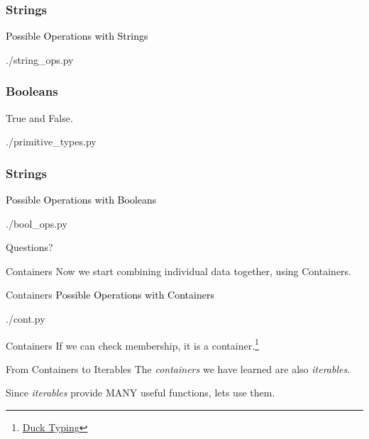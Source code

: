 \documentclass{beamer}
\begin{document}
\begin{frame}
  \frametitle{Strings}
  \textcolor{black}{\large{Possible Operations with Strings}}
  \begin{lstinputlisting}
    {./string_ops.py}
  \end{lstinputlisting}
\end{frame}

\begin{frame}
  \frametitle{Booleans}
  True and False.
  \begin{lstinputlisting}[firstline=14, lastline=15]
    {./primitive_types.py}
  \end{lstinputlisting}
\end{frame}

\begin{frame}
  \frametitle{Strings}
  \textcolor{black}{\large{Possible Operations with Booleans}}
  \begin{lstinputlisting}
    {./bool_ops.py}
  \end{lstinputlisting}
\end{frame}

\begin{frame}[plain, c]
  \begin{center}
    Questions?
  \end{center}
\end{frame}

\begin{frame}{Containers}
  Now we start combining individual data together,
  using Containers.
\end{frame}

\begin{frame}{Containers}
  \textcolor{black}{\large{Possible Operations with Containers}}
  \begin{lstinputlisting}
    {./cont.py}
  \end{lstinputlisting}
\end{frame}

\begin{frame}{Containers}
  If we can check membership, it is a
  container.\footnote{\footnotesize{\href{https://en.wikipedia.org/wiki/Duck\_typing}{Duck
  Typing}}}

\end{frame}

\begin{frame}{From Containers to Iterables}
  The \textit{containers} we have learned are also \textit{iterables}.

  Since \textit{iterables} provide MANY useful functions, lets use them.
\end{frame}
\end{document}
